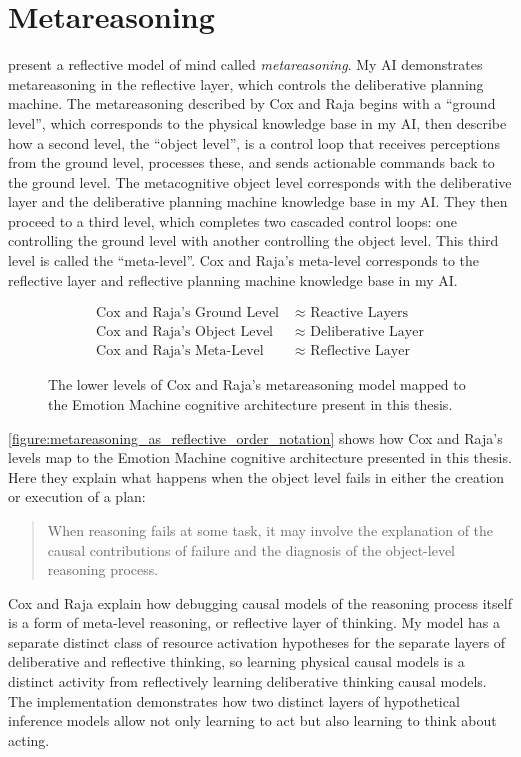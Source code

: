 \section{Metareasoning}

\cite{cox_and_raja:2008} present a reflective model of mind called
\emph{metareasoning}.  My AI demonstrates metareasoning in the
reflective layer, which controls the deliberative planning machine.
The metareasoning described by Cox and Raja begins with a ``ground
level'', which corresponds to the physical knowledge base in my AI,
then describe how a second level, the ``object level'', is a control
loop that receives perceptions from the ground level, processes these,
and sends actionable commands back to the ground level.  The
metacognitive object level corresponds with the deliberative layer and
the deliberative planning machine knowledge base in my AI.  They then
proceed to a third level, which completes two cascaded control loops:
one controlling the ground level with another controlling the object
level.  This third level is called the ``meta-level''.  Cox and Raja's
meta-level corresponds to the reflective layer and reflective planning
machine knowledge base in my AI.
\begin{figure}[bth]
\begin{align*}
\text{Cox and Raja's Ground Level } &{\approx} \text{ Reactive Layers} \\
\text{Cox and Raja's Object Level } &{\approx} \text{ Deliberative Layer} \\
\text{Cox and Raja's Meta-Level }   &{\approx} \text{ Reflective Layer}
\end{align*}
\caption{The lower levels of Cox and Raja's metareasoning model mapped
  to the Emotion Machine cognitive architecture present in this
  thesis.}
\label{figure:metareasoning_as_reflective_order_notation}
\end{figure}
\autoref{figure:metareasoning_as_reflective_order_notation} shows how
Cox and Raja's levels map to the Emotion Machine cognitive
architecture presented in this thesis.  Here they explain what happens
when the object level fails in either the creation or execution of a
plan:
\begin{quote}
When reasoning fails at some task, it may involve the explanation of
the causal contributions of failure and the diagnosis of the
object-level reasoning process.
\end{quote}
Cox and Raja explain how debugging causal models of the reasoning
process itself is a form of meta-level reasoning, or reflective layer
of thinking.  My model has a separate distinct class of resource
activation hypotheses for the separate layers of deliberative and
reflective thinking, so learning physical causal models is a distinct
activity from reflectively learning deliberative thinking causal
models.  The implementation demonstrates how two distinct layers of
hypothetical inference models allow not only learning to act but also
learning to think about acting.

